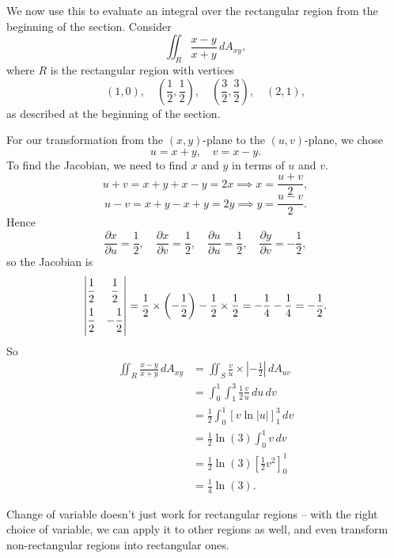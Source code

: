   \begin{example}
    We now use this to evaluate an integral over the rectangular region from the beginning of the section.  Consider
      \[
        \iint_R \frac{x - y}{x + y} \, dA_{xy},
      \]
    where $R$ is the rectangular region with vertices
      \[
        (1, 0), \quad \left(\frac{1}{2}, \frac{1}{2}\right), \quad \left(\frac{3}{2}, \frac{3}{2}\right), \quad (2, 1),
      \]
    as described at the beginning of the section.

    For our transformation from the $(x, y)$-plane to the $(u, v)$-plane, we chose
      \[
        u = x + y, \quad v = x - y.
      \]
    To find the Jacobian, we need to find $x$ and $y$ in terms of $u$ and $v$.
      \[
        u + v = x + y + x - y = 2x \implies x = \frac{u + v}{2},
      \]
      \[
        u - v = x + y - x + y = 2y \implies y = \frac{u - v}{2}.
      \]
    Hence
      \[
        \frac{\partial x}{\partial u} = \frac{1}{2}, \quad \frac{\partial x}{\partial v} = \frac{1}{2}, \quad \frac{\partial u}{\partial u} = \frac{1}{2}, \quad \frac{\partial y}{\partial v} = - \frac{1}{2},
      \]
    so the Jacobian is
      \[
        \left|
        \begin{matrix}
          \dfrac{\strut 1}{\strut 2} & \dfrac{\strut 1}{\strut 2}  \\
          \dfrac{\strut 1}{\strut 2} & - \dfrac{\strut 1}{\strut 2}
        \end{matrix}
        \right| = \frac{1}{2} \times \left(- \frac{1}{2}\right) - \frac{1}{2} \times \frac{1}{2} = - \frac{1}{4} - \frac{1}{4} = - \frac{1}{2}.
      \]
    So
      \begin{align*}
        \iint_R \frac{x - y}{x + y} \, dA_{xy} & = \iint_S \frac{v}{u} \times \left|- \frac{1}{2}\right| \, dA_{uv}  \\
        & = \int_0^1 \int_1^3 \frac{1}{2}\frac{v}{u} \, du \, dv  \\
        & = \frac{1}{2} \int_0^1 \left[v\ln\left|u\right|\right]_1^3 \, dv  \\
        & = \frac{1}{2}\ln(3)\int_0^1 v \, dv  \\
        & = \frac{1}{2}\ln(3)\left[\frac{1}{2}v^2\right]_0^1  \\
        & = \frac{1}{4}\ln(3).
      \end{align*}
  \end{example}

  Change of variable doesn't just work for rectangular regions -- with the right choice of variable, we can apply it to other regions as well, and even transform non-rectangular regions into rectangular ones.

